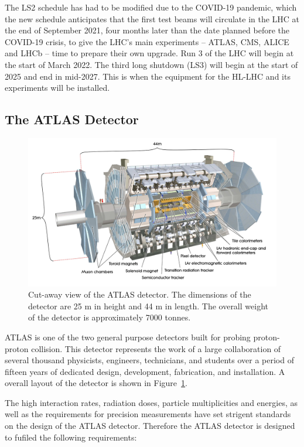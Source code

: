 \documentclass[letterpaper,12pt]{article}
\begin{document}
	The LS2 schedule has had to be modified due to the COVID-19 pandemic, 
	which the new schedule anticipates that the first test beams will 
	circulate in the LHC 
	at the end of September 2021, four months later than the date 
	planned before the COVID-19 crisis, 
	to give the LHC’s main experiments – ATLAS, CMS, ALICE and LHCb – 
	time to prepare their own upgrade. 
	Run 3 of the LHC will begin at the start of March 2022.
	The third long shutdown (LS3) will begin at the 
	start of 2025 and end in mid-2027. 
	This is when the equipment for the HL-LHC and 
	its experiments will be installed. 
	





\subsection{The ATLAS Detector}

\begin{figure}[bht]
	\begin{centering}	
	\includegraphics[width=.65\textwidth]{Detector_plots/Cut-away-view-of-the-ATLAS-detector.png}
	\caption{Cut-away view of the ATLAS detector. 
	The dimensions of the detector are 25 m in
	height and 44 m in length. The overall weight 
	of the detector is approximately 7000 tonnes.
		}
	\label{fig:ATLAS_cut_away}
	\end{centering}
\end{figure}

ATLAS is one of the 
two general purpose detectors built for probing proton-proton 
collision. This detector represents the work of a large collaboration 
of several thousand physicists, engineers, technicians,
and students over a period of fifteen years of dedicated 
design, development, fabrication, and installation.
A overall layout of the detector is shown in Figure~\ref{fig:ATLAS_cut_away}.

The high interaction rates, radiation doses, particle 
multiplicities and energies, as well as the
requirements for precision measurements have set strigent
standards on the design of the ATLAS detector. 
Therefore the ATLAS detector is designed to fufiled the following 
requirements:
\end{document}
